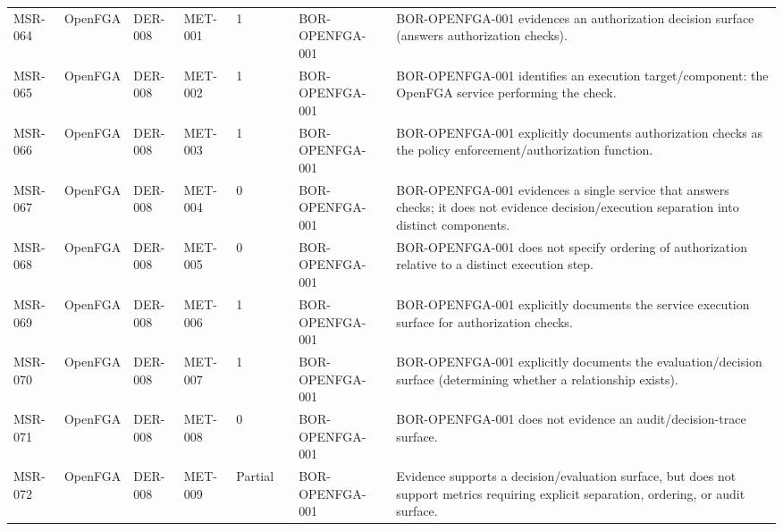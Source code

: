 \documentclass{article}
\begin{document}
\begin{longtable}{@{}p{}p{}p{}p{}p{}p{}p{}p{}@{}}
MSR-064 & OpenFGA & DER-008 & MET-001 & 1 &  & BOR-OPENFGA-001 & BOR-OPENFGA-001 evidences an authorization decision surface (answers authorization checks).\\
MSR-065 & OpenFGA & DER-008 & MET-002 & 1 &  & BOR-OPENFGA-001 & BOR-OPENFGA-001 identifies an execution target/component: the OpenFGA service performing the check.\\
MSR-066 & OpenFGA & DER-008 & MET-003 & 1 &  & BOR-OPENFGA-001 & BOR-OPENFGA-001 explicitly documents authorization checks as the policy enforcement/authorization function.\\
MSR-067 & OpenFGA & DER-008 & MET-004 & 0 &  & BOR-OPENFGA-001 & BOR-OPENFGA-001 evidences a single service that answers checks; it does not evidence decision/execution separation into distinct components.\\
MSR-068 & OpenFGA & DER-008 & MET-005 & 0 &  & BOR-OPENFGA-001 & BOR-OPENFGA-001 does not specify ordering of authorization relative to a distinct execution step.\\
MSR-069 & OpenFGA & DER-008 & MET-006 & 1 &  & BOR-OPENFGA-001 & BOR-OPENFGA-001 explicitly documents the service execution surface for authorization checks.\\
MSR-070 & OpenFGA & DER-008 & MET-007 & 1 &  & BOR-OPENFGA-001 & BOR-OPENFGA-001 explicitly documents the evaluation/decision surface (determining whether a relationship exists).\\
MSR-071 & OpenFGA & DER-008 & MET-008 & 0 &  & BOR-OPENFGA-001 & BOR-OPENFGA-001 does not evidence an audit/decision-trace surface.\\
MSR-072 & OpenFGA & DER-008 & MET-009 & Partial &  & BOR-OPENFGA-001 & Evidence supports a decision/evaluation surface, but does not support metrics requiring explicit separation, ordering, or audit surface.\\


\end{longtable}
\end{document}
